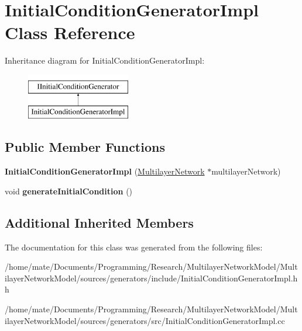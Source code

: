 \hypertarget{classInitialConditionGeneratorImpl}{}\section{Initial\+Condition\+Generator\+Impl Class Reference}
\label{classInitialConditionGeneratorImpl}
Inheritance diagram for Initial\+Condition\+Generator\+Impl\+:\begin{figure}[H]
\begin{center}
\leavevmode
\includegraphics[height=2.000000cm]{classInitialConditionGeneratorImpl}
\end{center}
\end{figure}
\subsection*{Public Member Functions}
\begin{DoxyCompactItemize}
\item 
{\bfseries Initial\+Condition\+Generator\+Impl} (\hyperlink{classMultilayerNetwork}{Multilayer\+Network} $\ast$multilayer\+Network)\hypertarget{classInitialConditionGeneratorImpl_a07647da5a3eece4804a53135bb54c738}{}\label{classInitialConditionGeneratorImpl_a07647da5a3eece4804a53135bb54c738}

\item 
void {\bfseries generate\+Initial\+Condition} ()\hypertarget{classInitialConditionGeneratorImpl_ab296cde00693ad9b2b0199c69a3c3326}{}\label{classInitialConditionGeneratorImpl_ab296cde00693ad9b2b0199c69a3c3326}

\end{DoxyCompactItemize}
\subsection*{Additional Inherited Members}


The documentation for this class was generated from the following files\+:\begin{DoxyCompactItemize}
\item 
/home/mate/\+Documents/\+Programming/\+Research/\+Multilayer\+Network\+Model/\+Multilayer\+Network\+Model/sources/generators/include/Initial\+Condition\+Generator\+Impl.\+hh\item 
/home/mate/\+Documents/\+Programming/\+Research/\+Multilayer\+Network\+Model/\+Multilayer\+Network\+Model/sources/generators/src/Initial\+Condition\+Generator\+Impl.\+cc\end{DoxyCompactItemize}
